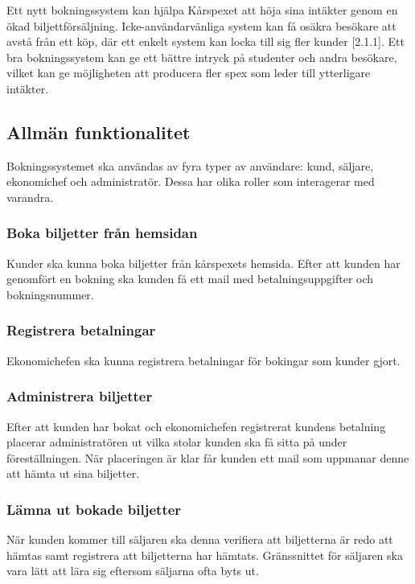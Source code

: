 \documentclass[a4paper, twoside, 11pt, titlepage]{article}
\begin{document}
	Ett nytt bokningssystem kan hjälpa Kårspexet att höja sina intäkter genom en ökad biljettförsäljning. Icke-användarvänliga system kan få osäkra besökare att avstå från ett köp, där ett enkelt system kan locka till sig fler kunder [2.1.1]. Ett bra bokningssystem kan ge ett bättre intryck på studenter och andra besökare, vilket kan ge möjligheten att producera fler spex som leder till ytterligare intäkter.

	\subsection{Allmän funktionalitet}


	Bokningssystemet ska användas av fyra typer av användare: kund, säljare, ekonomichef och administratör. Dessa har olika roller som interagerar med varandra.

		\subsubsection{Boka biljetter från hemsidan}


		Kunder ska kunna boka biljetter från kårspexets hemsida. Efter att kunden har genomfört en bokning ska kunden få ett mail med betalningsuppgifter och bokningsnummer.

		\subsubsection{Registrera betalningar}


		Ekonomichefen ska kunna registrera betalningar för bokingar som kunder gjort.

		\subsubsection{Administrera biljetter}


		Efter att kunden har bokat och ekonomichefen registrerat kundens betalning placerar administratören ut vilka stolar kunden ska få sitta på under föreställningen. När placeringen är klar får kunden ett mail som uppmanar denne att hämta ut sina biljetter.

		\subsubsection{Lämna ut bokade biljetter}


		När kunden kommer till säljaren ska denna verifiera att biljetterna är redo att hämtas samt registrera att biljetterna har hämtats. Gränssnittet för säljaren ska vara lätt att lära sig eftersom säljarna ofta byts ut.
\end{document}
